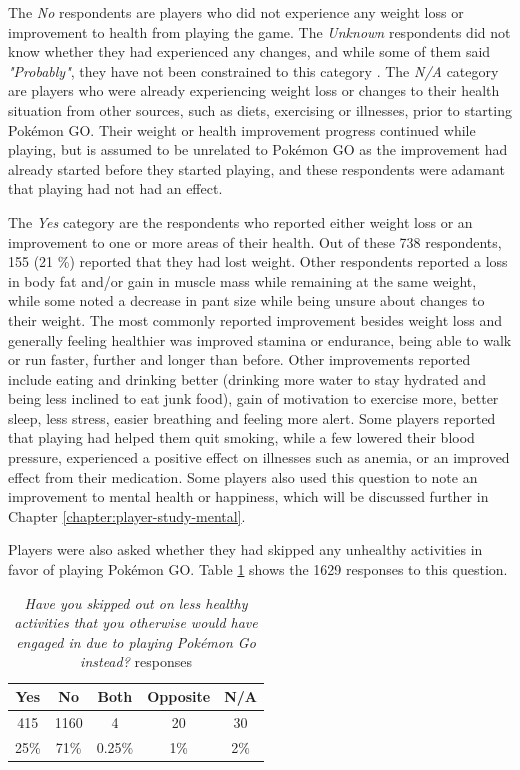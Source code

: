 The \emph{No} respondents are players who did not experience any weight loss or improvement to health from playing the game. The \emph{Unknown} respondents did not know whether they had experienced any changes, and while some of them said \emph{"Probably"}, they have not been constrained to this category . The \emph{N/A} category are players who were already experiencing weight loss or changes to their health situation from other sources, such as diets, exercising or illnesses, prior to starting Pokémon GO. Their weight or health improvement progress continued while playing, but is assumed to be unrelated to Pokémon GO as the improvement had already started before they started playing, and these respondents were adamant that playing had not had an effect.

The \emph{Yes} category are the respondents who reported either weight loss or an improvement to one or more areas of their health. Out of these 738 respondents, 155 (21 \%) reported that they had lost weight. Other respondents reported a loss in body fat and/or gain in muscle mass while remaining at the same weight, while some noted a decrease in pant size while being unsure about changes to their weight. The most commonly reported improvement besides weight loss and generally feeling healthier was improved stamina or endurance, being able to walk or run faster, further and longer than before. Other improvements reported include eating and drinking better (drinking more water to stay hydrated and being less inclined to eat junk food), gain of motivation to exercise more, better sleep, less stress, easier breathing and feeling more alert. Some players reported that playing had helped them quit smoking, while a few lowered their blood pressure, experienced a positive effect on illnesses such as anemia, or an improved effect from their medication. Some players also used this question to note an improvement to mental health or happiness, which will be discussed further in Chapter \ref{chapter:player-study-mental}.

Players were also asked whether they had skipped any unhealthy activities in favor of playing Pokémon GO. Table \ref{tbl:skipping-unhealthy-activities} shows the 1629 responses to this question.

\begin{table}[h]
	\centering
	\caption{\emph{Have you skipped out on less healthy activities that you otherwise would have engaged in due to playing Pokémon Go instead?} responses}
	\label{tbl:skipping-unhealthy-activities}
	\begin{tabular}{|c|c|c|c|c|}
		\hline
		\textbf{Yes} & \textbf{No} & \textbf{Both} & \textbf{Opposite} & \textbf{N/A}\\
		\hline\hline
		415		& 1160	& 4		& 20	& 30\\
		25\%	& 71\%	& 0.25\%& 1\%	& 2\%\\\hline
	\end{tabular}
\end{table}

